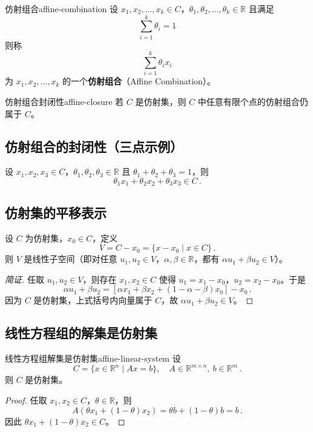\documentclass[11pt,a4paper]{article}
\begin{document}
\begin{definition}{仿射组合}{affine-combination}
设 $x_1, x_2, \dots, x_k \in C$，$\theta_1, \theta_2, \dots, \theta_k \in \mathbb{R}$ 且满足
\[
\sum_{i=1}^k \theta_i = 1
\]
则称
\[
\sum_{i=1}^k \theta_i x_i
\]
为 $x_1,x_2,\dots,x_k$ 的一个\textbf{仿射组合}（Affine Combination）。
\end{definition}

\begin{theorem}{仿射组合封闭性}{affine-closure}
若 $C$ 是仿射集，则 $C$ 中任意有限个点的仿射组合仍属于 $C$。
\end{theorem}

\subsection{仿射组合的封闭性（三点示例）}
设 $x_1, x_2, x_3 \in C$，$\theta_1, \theta_2, \theta_3 \in \mathbb{R}$ 且 $\theta_1 + \theta_2 + \theta_3 = 1$，则
\[
\theta_1 x_1 + \theta_2 x_2 + \theta_3 x_3 \in C\,.
\]

\subsection{仿射集的平移表示}
设 $C$ 为仿射集，$x_0 \in C$，定义
\[
V = C - x_0 = \{ x - x_0 \mid x \in C \}\,.
\]
则 $V$ 是线性子空间（即对任意 $u_1, u_2 \in V$，$\alpha, \beta \in \mathbb{R}$，都有 $\alpha u_1 + \beta u_2 \in V$）。

\begin{proof}[简证]
任取 $u_1, u_2 \in V$，则存在 $x_1, x_2 \in C$ 使得 $u_1 = x_1 - x_0$，$u_2 = x_2 - x_0$。于是
\[
\alpha u_1 + \beta u_2 = [\alpha x_1 + \beta x_2 + (1-\alpha-\beta)x_0] - x_0\,.
\]
因为 $C$ 是仿射集，上式括号内向量属于 $C$，故 $\alpha u_1 + \beta u_2 \in V$。
\end{proof}

\subsection{线性方程组的解集是仿射集}
\begin{example}{线性方程组解集是仿射集}{affine-linear-system}
设
\[
C = \{ x \in \mathbb{R}^n \mid Ax = b \},\quad A \in \mathbb{R}^{m \times n},\ b \in \mathbb{R}^m\,.
\]
则 $C$ 是仿射集。
\end{example}

\begin{proof}
任取 $x_1, x_2 \in C$，$\theta \in \mathbb{R}$，则
\[
A(\theta x_1 + (1-\theta)x_2) = \theta b + (1-\theta)b = b\,.
\]
因此 $\theta x_1 + (1-\theta)x_2 \in C$。
\end{proof}
\end{document}
